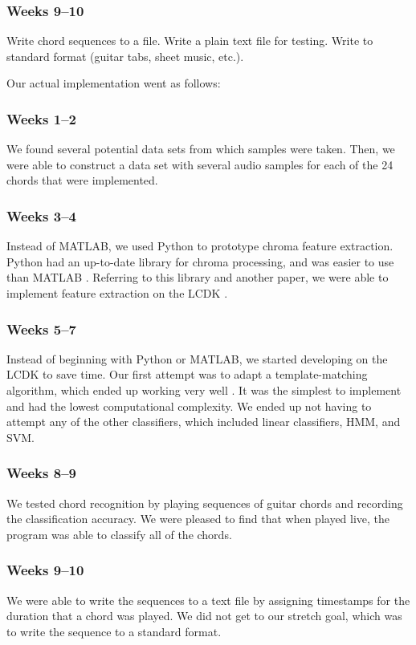 \documentclass[journal]{IEEEtran}
\begin{document}
\subsubsection*{Weeks 9--10}
Write chord sequences to a file.
Write a plain text file for testing.
Write to standard format (guitar tabs, sheet music, etc.).

Our actual implementation went as follows:

\subsubsection*{Weeks 1--2}
We found several potential data sets from which samples were taken.
Then, we were able to construct a data set with several audio samples for each of the 24 chords that were implemented.

\subsubsection*{Weeks 3--4}
Instead of MATLAB, we used Python to prototype chroma feature extraction.
Python had an up-to-date library for chroma processing, and was easier to use than MATLAB \cite{librosa}.
Referring to this library and another paper, we were able to implement feature extraction on the LCDK \cite{librosa, stark}.

\subsubsection*{Weeks 5--7}
Instead of beginning with Python or MATLAB, we started developing on the LCDK to save time.
Our first attempt was to adapt a template-matching algorithm, which ended up working very well \cite{stark}.
It was the simplest to implement and had the lowest computational complexity.
We ended up not having to attempt any of the other classifiers, which included linear classifiers, HMM, and SVM.

\subsubsection*{Weeks 8--9}
We tested chord recognition by playing sequences of guitar chords and recording the classification accuracy.
We were pleased to find that when played live, the program was able to classify all of the chords.

\subsubsection*{Weeks 9--10}
We were able to write the sequences to a text file by assigning timestamps for the duration that a chord was played.
We did not get to our stretch goal, which was to write the sequence to a standard format.
\end{document}
